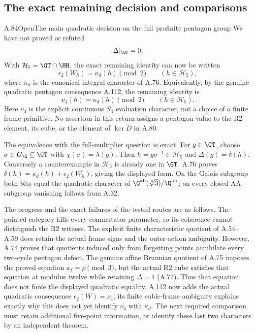 \subsection{The exact remaining decision and comparisons}


\begin{statement}{A.84}{Open}{The main quadratic decision on the full profinite pentagon group}
We have not proved or refuted
\[
                    \Delta|_{\GT}=0.
\]
With $\mathcal H_5=\GT\cap\HH$, the exact remaining identity
can now be written
\[
 \epsilon_2(W_h)=\kappa_d(h)\pmod2
                      \qquad(h\in\mathcal H_5),
\]
where $\kappa_d$ is the canonical integral character of A.76.
Equivalently, by the genuine quadratic pentagon consequence
A.112, the remaining identity is
\[
                 \nu_4(h)=\kappa_d(h)\pmod2
                    \qquad(h\in\mathcal H_5).
\]
Here $\nu_4$ is the explicit continuous $S_4$ evaluation
character, not a choice of a finite frame primitive.
No assertion in this return assigns a pentagon value to the R2
element, its cube, or the element of $\ker D$ in A.80.
\end{statement}
The equivalence with the full-multiplier question is exact.
For $g\in\GT$, choose $\sigma\in G_{\Q}\subseteq\GT$ with
$\chi(\sigma)=\lambda(g)$. Then $h=g\sigma^{-1}\in\mathcal H_5$
and $\Delta(g)=\delta(h)$. Conversely a counterexample in
$\mathcal H_5$ is already one in $\GT$. A.76 proves
$\delta(h)=\kappa_d(h)+\epsilon_2(W_h)$, giving the displayed
form. On the Galois subgroup both bits equal the quadratic
character of $\Q^{\rm ab}(\sqrt[4]3)/\Q^{\rm ab}$; on every
closed AA subgroup vanishing follows from A.32.

The progress and the exact failures of the tested routes are as
follows. The pointed category kills every commutator parameter,
so its coherence cannot distinguish the R2 witness. The explicit
finite characteristic quotient of A.54--A.59 does retain the
actual frame signs and the outer-action ambiguity. However,
A.74 proves that quotients induced only from forgetting points
annihilate every two-cycle pentagon defect. The genuine affine
Brunnian quotient of A.75 imposes the proved equation
$a_f=\rho\pmod3$, but the actual R2 cube satisfies that equation
at modulus twelve while retaining $\Delta=1$ (A.77).
Thus that equation does not force the displayed quadratic equality.
A.112 now adds the actual quadratic consequence
$\epsilon_2(W)=\nu_4$; its finite cubic-frame ambiguity explains
exactly why this does not yet identify $\nu_4$ with $\kappa_d$.
The next required comparison must retain additional five-point
information, or identify these last two characters by an
independent theorem.

